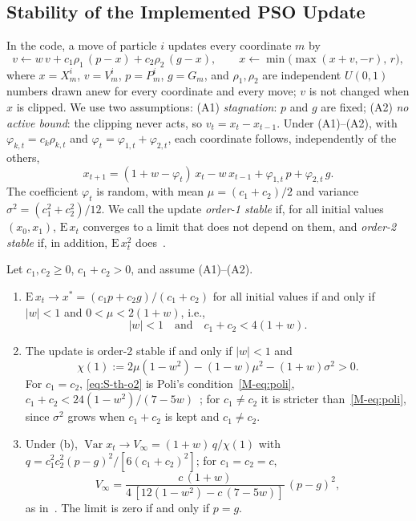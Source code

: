 \subsection{Stability of the Implemented PSO Update}
\label{sec:S-th-pso}
In the code, a move of particle $i$ updates every coordinate $m$ by
\begin{equation}
v\leftarrow w\,v+c_1\rho_1\,(p-x)+c_2\rho_2\,(g-x),\qquad x\leftarrow \min\bigl(\max(x+v,-r),\,r\bigr),
\label{eq:S-th-upd}
\end{equation}
where $x=X^i_m$, $v=V^i_m$, $p=P^i_m$, $g=G_m$, and $\rho_1,\rho_2$ are independent $U(0,1)$ numbers drawn anew for every coordinate and every move; $v$ is not changed when $x$ is clipped. We use two assumptions: (A1) \emph{stagnation}: $p$ and $g$ are fixed; (A2) \emph{no active bound}: the clipping never acts, so $v_t=x_t-x_{t-1}$. Under (A1)--(A2), with $\varphi_{k,t}=c_k\rho_{k,t}$ and $\varphi_t=\varphi_{1,t}+\varphi_{2,t}$, each coordinate follows, independently of the others,
\begin{equation}
x_{t+1}=(1+w-\varphi_t)\,x_t-w\,x_{t-1}+\varphi_{1,t}\,p+\varphi_{2,t}\,g .
\label{eq:S-th-rec}
\end{equation}
The coefficient $\varphi_t$ is random, with mean $\mu=(c_1+c_2)/2$ and variance $\sigma^2=(c_1^2+c_2^2)/12$. We call the update \emph{order-1 stable} if, for all initial values $(x_0,x_1)$, $\mathrm E\,x_t$ converges to a limit that does not depend on them, and \emph{order-2 stable} if, in addition, $\mathrm E\,x_t^2$ does~\cite{Poli2009}.

\begin{thS}
\label{prop:S-pso-stability}
Let $c_1,c_2\ge0$, $c_1+c_2>0$, and assume (A1)--(A2).
\begin{enumerate}
\item[(a)] $\mathrm E\,x_t\to x^*=(c_1p+c_2g)/(c_1+c_2)$ for all initial values if and only if $\lvert w\rvert<1$ and $0<\mu<2(1+w)$, i.e.,
\begin{equation}
\lvert w\rvert<1\quad\text{and}\quad c_1+c_2<4(1+w).
\label{eq:S-th-o1}
\end{equation}
\item[(b)] The update is order-2 stable if and only if $\lvert w\rvert<1$ and
\begin{equation}
\chi(1):=2\mu(1-w^2)-(1-w)\mu^2-(1+w)\sigma^2>0 .
\label{eq:S-th-o2}
\end{equation}
For $c_1=c_2$, \eqref{eq:S-th-o2} is Poli's condition~\eqref{M-eq:poli}, $c_1+c_2<24(1-w^2)/(7-5w)$~\cite{Poli2009}; for $c_1\ne c_2$ it is stricter than~\eqref{M-eq:poli}, since $\sigma^2$ grows when $c_1+c_2$ is kept and $c_1\ne c_2$.
\item[(c)] Under (b), $\operatorname{Var}x_t\to V_\infty=(1+w)\,q/\chi(1)$ with $q=c_1^2c_2^2(p-g)^2/[6(c_1+c_2)^2]$; for $c_1=c_2=c$,
\begin{equation}
V_\infty=\frac{c\,(1+w)}{4\,[12(1-w^2)-c\,(7-5w)]}\,(p-g)^2 ,
\label{eq:S-th-vinf}
\end{equation}
as in~\cite{Poli2009}. The limit is zero if and only if $p=g$.
\end{enumerate}
\end{thS}

